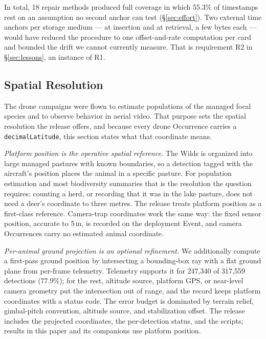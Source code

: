 \documentclass[sigconf]{acmart}
\begin{document}
In total, 18 repair methods produced full coverage in which 55.3\% of
timestamps rest on an assumption no second anchor can test
(\S\ref{sec:effort}). Two external time anchors per storage medium --- at
insertion and at retrieval, a few bytes each --- would have reduced the
procedure to one offset-and-rate computation per card and bounded the
drift we cannot currently measure. That is requirement R2 in
\S\ref{sec:lessons}, an instance of R1.

\subsection{Spatial Resolution}
\label{sec:scope}

The drone campaigns were flown to estimate populations of the managed
focal species and to observe behavior in aerial video. That purpose
sets the spatial resolution the release offers, and because every drone
Occurrence carries a \texttt{decimalLatitude}, this section states what
that coordinate means.

\emph{Platform position is the operative spatial reference.} The Wilds is organized into large managed pastures with known
boundaries, so a detection tagged with the aircraft's position places
the animal in a specific pasture. For population estimation and most
biodiversity summaries that is the resolution the question requires:
counting a herd, or recording that it was in the lake pasture, does not
need a deer's coordinate to three metres. The release treats platform
position as a first-class reference. Camera-trap coordinates work the same way: the fixed sensor
position, accurate to 5\,m, is recorded on the deployment Event, and
camera Occurrences carry no estimated animal coordinate.

\emph{Per-animal ground projection is an optional refinement.} We
additionally compute a first-pass ground position by intersecting a
bounding-box ray with a flat ground plane from per-frame telemetry.
Telemetry supports it for 247{,}340 of 317{,}559 detections (77.9\%);
for the rest, altitude source, platform GPS, or near-level camera
geometry put the intersection out of range, and the record keeps
platform coordinates with a status code. The error budget is dominated
by terrain relief, gimbal-pitch convention, altitude source, and
stabilization offset. The release includes the projected coordinates,
the per-detection status, and the scripts; results in this paper and
its companions use platform position.
\end{document}
